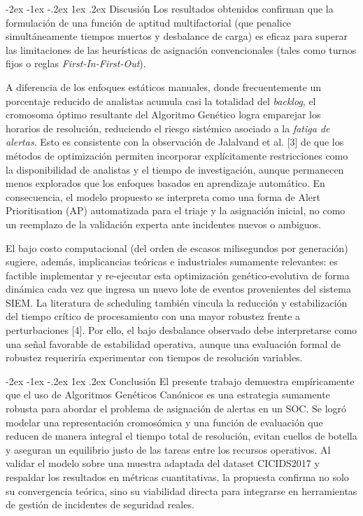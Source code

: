 \documentclass[12pt,a4paper,twocolumn]{article}
\makeatletter
\renewcommand{\section}{\@startsection{section}{1}{\z@}%
  {-2ex \@plus -1ex \@minus -.2ex}%
  {1ex \@plus.2ex}%
  {\fontsize{12}{14}\selectfont\bfseries}}
\makeatother
\begin{document}
\section{Discusión}
Los resultados obtenidos confirman que la formulación de una función de aptitud multifactorial (que penalice simultáneamente tiempos muertos y desbalance de carga) es eficaz para superar las limitaciones de las heurísticas de asignación convencionales (tales como turnos fijos o reglas \textit{First-In-First-Out}). 

A diferencia de los enfoques estáticos manuales, donde frecuentemente un porcentaje reducido de analistas acumula casi la totalidad del \textit{backlog}, el cromosoma óptimo resultante del Algoritmo Genético logra emparejar los horarios de resolución, reduciendo el riesgo sistémico asociado a la \textit{fatiga de alertas}. Esto es consistente con la observación de Jalalvand et al. [3] de que los métodos de optimización permiten incorporar explícitamente restricciones como la disponibilidad de analistas y el tiempo de investigación, aunque permanecen menos explorados que los enfoques basados en aprendizaje automático. En consecuencia, el modelo propuesto se interpreta como una forma de Alert Prioritisation (AP) automatizada para el triaje y la asignación inicial, no como un reemplazo de la validación experta ante incidentes nuevos o ambiguos.

El bajo costo computacional (del orden de escasos milisegundos por generación) sugiere, además, implicancias teóricas e industriales sumamente relevantes: es factible implementar y re-ejecutar esta optimización genético-evolutiva de forma dinámica cada vez que ingresa un nuevo lote de eventos provenientes del sistema SIEM. La literatura de scheduling también vincula la reducción y estabilización del tiempo crítico de procesamiento con una mayor robustez frente a perturbaciones [4]. Por ello, el bajo desbalance observado debe interpretarse como una señal favorable de estabilidad operativa, aunque una evaluación formal de robustez requeriría experimentar con tiempos de resolución variables.

\section{Conclusión}
El presente trabajo demuestra empíricamente que el uso de Algoritmos Genéticos Canónicos es una estrategia sumamente robusta para abordar el problema de asignación de alertas en un SOC. Se logró modelar una representación cromosómica y una función de evaluación que reducen de manera integral el tiempo total de resolución, evitan cuellos de botella y aseguran un equilibrio justo de las tareas entre los recursos operativos. Al validar el modelo sobre una muestra adaptada del dataset CICIDS2017 y respaldar los resultados en métricas cuantitativas, la propuesta confirma no solo su convergencia teórica, sino su viabilidad directa para integrarse en herramientas de gestión de incidentes de seguridad reales.
\end{document}

